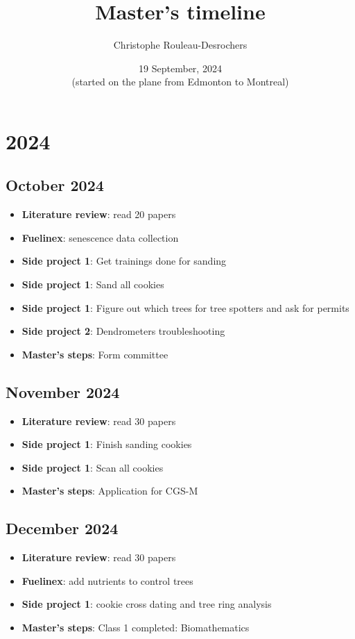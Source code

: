 \documentclass{article}
\title{Master's timeline}
\author[]{Christophe Rouleau-Desrochers}
\date{19 September, 2024 \\ (started on the plane from Edmonton to Montreal)}
\begin{document}
\maketitle

\section{2024}
\subsection {October 2024}
\begin {itemize}
	\item \textbf{Literature review}: read 20 papers
	\item \textbf{Fuelinex}: senescence data collection
	\item \textbf{Side project 1}: Get trainings done for sanding 
	\item \textbf{Side project 1}: Sand all cookies
	\item \textbf{Side project 1}: Figure out which trees for tree spotters and ask for permits
	\item \textbf{Side project 2}: Dendrometers troubleshooting
	\item \textbf{Master's steps}: Form committee
\end {itemize}

\subsection {November 2024}
\begin {itemize}
	\item \textbf{Literature review}: read 30 papers
	\item \textbf{Side project 1}: Finish sanding cookies
	\item \textbf{Side project 1}: Scan all cookies
	\item \textbf{Master's steps}: Application for CGS-M	
\end {itemize}

\subsection {December 2024}
\begin {itemize}
	\item \textbf{Literature review}: read 30 papers
	\item \textbf{Fuelinex}: add nutrients to control trees
	\item \textbf{Side project 1}: cookie cross dating and tree ring analysis
	\item \textbf{Master's steps}: Class 1 completed: Biomathematics
\end {itemize}
\end{document}
